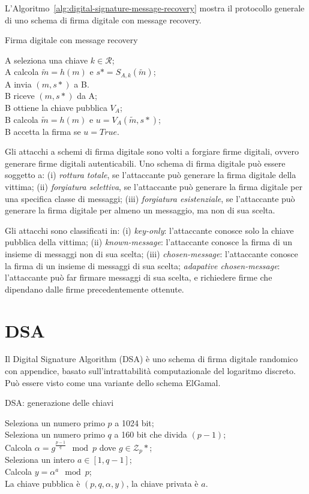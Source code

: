 L'Algoritmo~\ref{alg:digital-signature-message-recovery} mostra il protocollo generale di uno schema di firma digitale con message recovery.

\bigskip
\begin{algorithm}[H]
  \caption{Firma digitale con message recovery}
  \label{alg:digital-signature-message-recovery}
  \SetAlgoNoLine
  A seleziona una chiave $k \in \mathcal{R}$;\\
  A calcola $\tilde{m}=h(m)$ e $s*=S_{A,k}(\tilde{m})$;\\
  A invia $(m,s*)$ a B.\\

  B riceve $(m,s*)$ da A;\\
  B ottiene la chiave pubblica $V_{A}$;\\
  B calcola $\tilde{m}=h(m)$ e $u=V_{A}(\tilde{m},s*)$;\\
  B accetta la firma se $u=True$.
\end{algorithm}

Gli attacchi a schemi di firma digitale sono volti a forgiare firme digitali, ovvero generare firme digitali autenticabili.
Uno schema di firma digitale può essere soggetto a:
(i) \textit{rottura totale}, se l'attaccante può generare la firma digitale della vittima;
(ii) \textit{forgiatura selettiva}, se l'attaccante può generare la firma digitale per una specifica classe di messaggi;
(iii) \textit{forgiatura esistenziale}, se l'attaccante può generare la firma digitale per almeno un messaggio, ma non di sua scelta.

Gli attacchi sono classificati in:
(i) \textit{key-only}: l'attaccante conosce solo la chiave pubblica della vittima;
(ii) \textit{known-message}: l'attaccante conosce la firma di un insieme di messaggi non di sua scelta;
(iii) \textit{chosen-message}: l'attaccante conosce la firma di un insieme di messaggi di sua scelta;
\textit{adapative chosen-message}: l'attaccante può far firmare messaggi di sua scelta, e richiedere firme che dipendano dalle firme precedentemente ottenute.

\section{DSA}
Il Digital Signature Algorithm (DSA) è uno schema di firma digitale randomico con appendice, basato sull'intrattabilità computazionale del logaritmo discreto.
Può essere visto come una variante dello schema ElGamal.

\bigskip
\begin{algorithm}[H]
  \caption{DSA: generazione delle chiavi}
  \label{alg:dsa-key-generation}
  \SetAlgoNoLine
  Seleziona un numero primo $p$ a 1024 bit;\\
  Seleziona un numero primo $q$ a 160 bit che divida $(p-1)$;\\
  Calcola $\alpha=g^{\frac{p-1}{q}} \mod p$ dove $g \in \mathcal{Z}_{p}*$;\\
  Seleziona un intero $a \in [1,q-1]$;\\
  Calcola $y=\alpha^{a} \mod p$;\\
  La chiave pubblica è $(p,q,\alpha,y)$, la chiave privata è $a$.
\end{algorithm}

